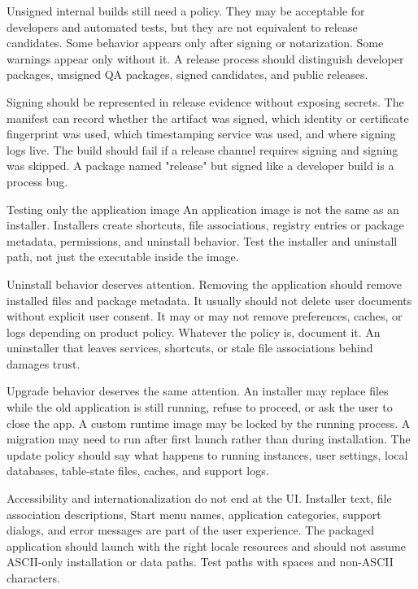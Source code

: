 Unsigned internal builds still need a policy. They may be acceptable for developers and automated tests, but they are not equivalent to release candidates. Some behavior appears only after signing or notarization. Some warnings appear only without it. A release process should distinguish developer packages, unsigned QA packages, signed candidates, and public releases.

Signing should be represented in release evidence without exposing secrets. The manifest can record whether the artifact was signed, which identity or certificate fingerprint was used, which timestamping service was used, and where signing logs live. The build should fail if a release channel requires signing and signing was skipped. A package named "release" but signed like a developer build is a process bug.

\begin{pitfallbox}{Testing only the application image}
An application image is not the same as an installer. Installers create shortcuts, file associations, registry entries or package metadata, permissions, and uninstall behavior. Test the installer and uninstall path, not just the executable inside the image.
\end{pitfallbox}

Uninstall behavior deserves attention. Removing the application should remove installed files and package metadata. It usually should not delete user documents without explicit user consent. It may or may not remove preferences, caches, or logs depending on product policy. Whatever the policy is, document it. An uninstaller that leaves services, shortcuts, or stale file associations behind damages trust.

Upgrade behavior deserves the same attention. An installer may replace files while the old application is still running, refuse to proceed, or ask the user to close the app. A custom runtime image may be locked by the running process. A migration may need to run after first launch rather than during installation. The update policy should say what happens to running instances, user settings, local databases, table-state files, caches, and support logs.

Accessibility and internationalization do not end at the UI. Installer text, file association descriptions, Start menu names, application categories, support dialogs, and error messages are part of the user experience. The packaged application should launch with the right locale resources and should not assume ASCII-only installation or data paths. Test paths with spaces and non-ASCII characters.

